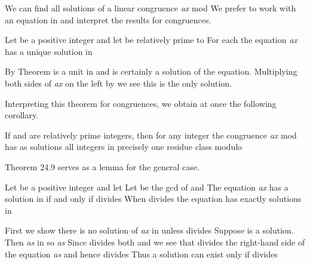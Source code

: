 \documentclass[11pt,oneside]{article}
\begin{document}
\begin{BookBody}


\noindent We can find all solutions of a linear congruence\textit{ ax} mod  We prefer to work with an equation in  and interpret the results for congruences.

 Let  be a positive integer and let  be relatively prime to  For each  the equation\textit{ ax}  has a unique solution in 

 By Theorem  is a unit in  and  is certainly a solution of the equation. Multiplying both sides of\textit{ ax}  on the left by  we see this is the only solution. \BookEnd{\blacklozenge}

Interpreting this theorem for congruences, we obtain at once the following corollary.

 If  and  are relatively prime integers, then for any integer  the congruence\textit{ ax} \BookInline{\equiv } mod  has as solutions all integers in precisely one residue class modulo \BookEnd{\blacklozenge}

\noindent Theorem 24.9 serves as a lemma for the general case.

 Let  be a positive integer and let  Let  be the gcd of  and  The equation \textit{ax}  has a solution in  if and only if  divides  When  divides  the equation has exactly  solutions in 

 First we show there is no solution of\textit{ ax}  in  unless  divides  Suppose  is a solution. Then\textit{ as}  in  so  \textit{as}  Since  divides both  and  we see that  divides the right-hand side of the equation  \textit{as}  and hence divides  Thus a solution  can exist only if  divides 


\end{BookBody}
\end{document}
